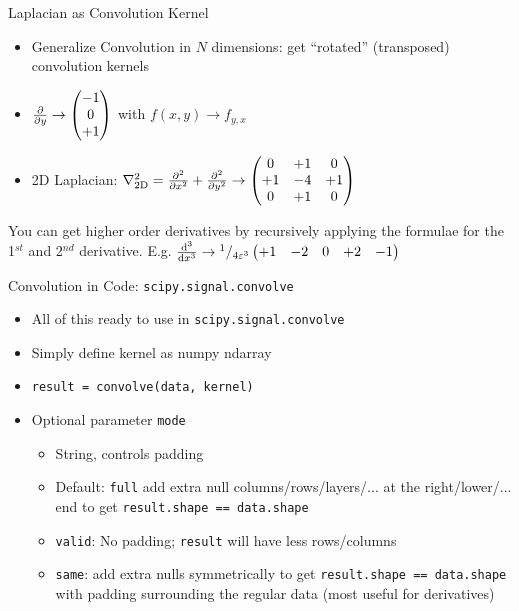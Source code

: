 \begin{frame}{Laplacian as Convolution Kernel}
%
\begin{itemize}
\item Generalize Convolution in $N$ dimensions: get \enquote{rotated} (transposed) convolution kernels
\item $\pdv{y} \to \begin{pmatrix}
-1 \\ 0 \\ +1
\end{pmatrix}$ with $f(x, y) \to f_{y,x}$
\item 2D Laplacian:
$
\laplacian_{\text{2D}} = \pdv[2]{x} + \pdv[2]{y}
\to \begin{pmatrix}
  0 & +1 &  0 \\
 +1 & -4 & +1 \\
  0 & +1 &  0 
\end{pmatrix}
$
\end{itemize}
%
\begin{hintbox}
\small
You can get higher order derivatives by recursively applying the formulae for the 1$^{st}$ and 2$^{nd}$ derivative. E.\;g.
$\dv[3]{x} \to
{}^{1}/_{4\varepsilon^3}
\begin{pmatrix}
+1 & -2 & 0 & +2 & -1
\end{pmatrix}$
\end{hintbox}
%
\end{frame}


\begin{frame}{Convolution in Code: \texttt{scipy.signal.convolve}}
%
\begin{itemize}
\item All of this ready to use in \texttt{scipy.signal.convolve}
\item Simply define kernel as numpy ndarray
\item \texttt{result = convolve(data, kernel)}
\item Optional parameter \texttt{mode}
	\begin{itemize}
	\item String, controls padding
	\item Default: \texttt{full} add extra null columns/rows/layers/... at the right/lower/... end to get \texttt{result.shape == data.shape}
	\item \texttt{valid}: No padding; \texttt{result} will have less rows/columns
	\item \texttt{same}: add extra nulls symmetrically to get \texttt{result.shape == data.shape} with padding surrounding the regular data (most useful for derivatives)
	\end{itemize}
\end{itemize}
%
\end{frame}

